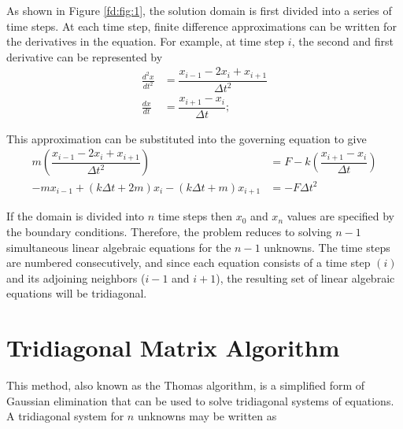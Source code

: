 \documentclass[book.tex]{subfiles}
\begin{document}
As shown in Figure \ref{fd:fig:1}, the solution domain is first divided into a series of time steps. At each time step, finite difference approximations can be written for the derivatives in the equation. For example, at time step $i$, the second and first derivative can be represented by 
\begin{align}
\frac{d^2x}{dt^2} &= \dfrac{x_{i-1}-2x_i+x_{i+1}}{\Delta t^2}\\
\frac{dx}{dt} &=  \dfrac{x_{i+1}-x_i}{\Delta t};
\end{align}

This approximation can be substituted into the governing equation to give
\begin{align}
m\left (\dfrac{x_{i-1}-2x_i+x_{i+1}}{\Delta t^2}\right) &= F - k\left (\dfrac{x_{i+1}-x_i}{\Delta t}\right )\\
-mx_{i-1} + (k\Delta t + 2m)x_i - (k\Delta t + m)x_{i+1} &= -F\Delta t^2
\end{align}

If the domain is divided into $n$ time steps then $x_0$ and $x_n$ values are specified by the boundary conditions. Therefore, the problem reduces to solving $n-1$ simultaneous linear algebraic equations for the $n-1$ unknowns. The time steps are numbered consecutively, and since each equation
consists of a time step $(i)$ and its adjoining neighbors ($i-1$ and $i+1$), the resulting set of linear algebraic equations will be tridiagonal. \\


\section{Tridiagonal Matrix Algorithm}
This method, also known as the Thomas algorithm, is a simplified form of Gaussian elimination that can be used to solve tridiagonal systems of equations. A tridiagonal system for $n$ unknowns may be written as
\end{document}
